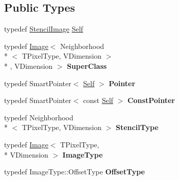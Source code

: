 \subsection*{Public Types}
\begin{DoxyCompactItemize}
\item 
typedef \hyperlink{classitk_1_1mad_1_1_stencil_image}{Stencil\-Image} \hyperlink{classitk_1_1mad_1_1_stencil_image_a3cd288ed59c1431bf14b735b995cf58c}{Self}
\item 
\hypertarget{classitk_1_1mad_1_1_stencil_image_aaedf6e494e423e4aba74c26d970c2b1f}{typedef \hyperlink{class_image}{Image}$<$ Neighborhood\\*
$<$ T\-Pixel\-Type, V\-Dimension $>$\\*
, V\-Dimension $>$ {\bfseries Super\-Class}}\label{classitk_1_1mad_1_1_stencil_image_aaedf6e494e423e4aba74c26d970c2b1f}

\item 
\hypertarget{classitk_1_1mad_1_1_stencil_image_ad40004fa579b36db5e85209e1d559fec}{typedef Smart\-Pointer$<$ \hyperlink{classitk_1_1mad_1_1_stencil_image_a3cd288ed59c1431bf14b735b995cf58c}{Self} $>$ {\bfseries Pointer}}\label{classitk_1_1mad_1_1_stencil_image_ad40004fa579b36db5e85209e1d559fec}

\item 
\hypertarget{classitk_1_1mad_1_1_stencil_image_a36d23e924004565c1294bc8c68d601de}{typedef Smart\-Pointer$<$ const \hyperlink{classitk_1_1mad_1_1_stencil_image_a3cd288ed59c1431bf14b735b995cf58c}{Self} $>$ {\bfseries Const\-Pointer}}\label{classitk_1_1mad_1_1_stencil_image_a36d23e924004565c1294bc8c68d601de}

\item 
\hypertarget{classitk_1_1mad_1_1_stencil_image_ab44e26a599f3e210a5631caefe172732}{typedef Neighborhood\\*
$<$ T\-Pixel\-Type, V\-Dimension $>$ {\bfseries Stencil\-Type}}\label{classitk_1_1mad_1_1_stencil_image_ab44e26a599f3e210a5631caefe172732}

\item 
\hypertarget{classitk_1_1mad_1_1_stencil_image_a5f68ed1c8592a0570a58ac007a509f11}{typedef \hyperlink{class_image}{Image}$<$ T\-Pixel\-Type, \\*
V\-Dimension $>$ {\bfseries Image\-Type}}\label{classitk_1_1mad_1_1_stencil_image_a5f68ed1c8592a0570a58ac007a509f11}

\item 
\hypertarget{classitk_1_1mad_1_1_stencil_image_ab9a05a7d77b7149fb84f5699744f9bae}{typedef Image\-Type\-::\-Offset\-Type {\bfseries Offset\-Type}}\label{classitk_1_1mad_1_1_stencil_image_ab9a05a7d77b7149fb84f5699744f9bae}


\end{DoxyCompactItemize}

